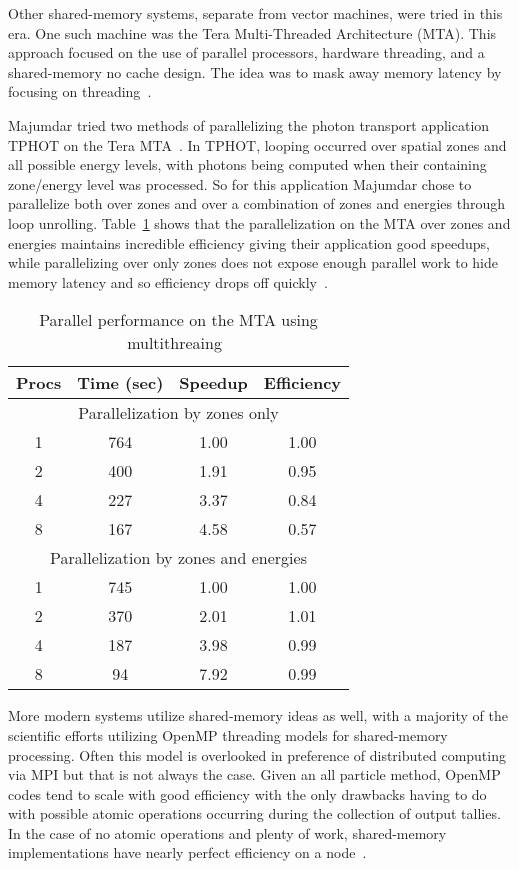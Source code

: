 %
Other shared-memory systems, separate from vector machines, were tried in this era.
%
One such machine was the Tera Multi-Threaded Architecture (MTA).
%
This approach focused on the use of parallel processors, hardware threading, and a shared-memory no cache design.
%
The idea was to mask away memory latency by focusing on threading~\cite{majumdar2000parallel, snavely1998multi}.
%

%
Majumdar tried two methods of parallelizing the photon transport application TPHOT on the Tera MTA~\cite{majumdar2000parallel}. 
%
In TPHOT, looping occurred over spatial zones and all possible energy levels, with photons being computed when their containing zone/energy level was processed.
%
So for this application Majumdar chose to parallelize both over zones and over a combination of zones and energies through loop unrolling.
%
Table~\ref{tab:MTAPerf} shows that the parallelization on the MTA over zones and energies maintains incredible efficiency giving their application good speedups, while parallelizing over only zones does not expose enough parallel work to hide memory latency and so efficiency drops off quickly~\cite{majumdar2000parallel}.
%
\begin{table}
\caption {Parallel performance on the MTA using multithreaing~\cite{majumdar2000parallel}} \label{tab:MTAPerf} 
\begin{center}
\begin{tabular}{|c|c|c|c|}
\hline
Procs & Time (sec) & Speedup & Efficiency \\
\hline
\multicolumn{4}{|c|}{Parallelization by zones only} \\
\hline
1 & 764 & 1.00 & 1.00 \\
\hline
2 & 400 & 1.91 & 0.95 \\
\hline
4 & 227 & 3.37 & 0.84 \\
\hline
8 & 167 & 4.58 & 0.57 \\
\hline
\multicolumn{4}{|c|}{Parallelization by zones and energies} \\
\hline
1 & 745 & 1.00 & 1.00 \\
\hline
2 & 370 & 2.01 & 1.01 \\
\hline
4 & 187 & 3.98 & 0.99 \\
\hline
8 & 94 & 7.92 & 0.99 \\
\hline
\end{tabular}
\end{center}
\end{table}

More modern systems utilize shared-memory ideas as well, with a majority of the scientific efforts utilizing OpenMP threading models for shared-memory processing.
%
Often this model is overlooked in preference of distributed computing via MPI but that is not always the case.
%
Given an all particle method, OpenMP codes tend to scale with good efficiency with the only drawbacks having to do with possible atomic operations occurring during the collection of output tallies.
%
In the case of no atomic operations and plenty of work, shared-memory implementations have nearly perfect efficiency on a node~\cite{siegel2014multi}.

